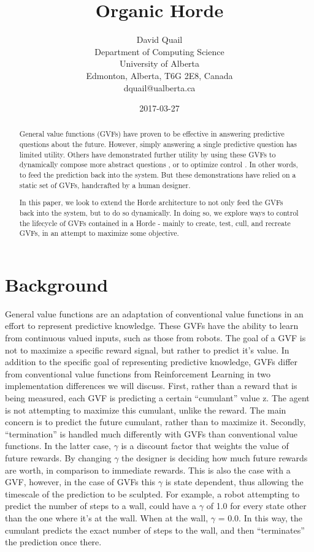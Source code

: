 \documentclass[letterpaper]{article}
\title{Organic Horde}
\date{2017-03-27}
\author{David Quail\\
Department of Computing Science \\ University of Alberta \\
Edmonton, Alberta, T6G 2E8, Canada \\
dquail@ualberta.ca}
\begin{document}
\maketitle
\begin{abstract}
General value functions (GVFs) have proven to be effective in answering predictive questions about the future. However, simply answering a single predictive question has limited utility. Others have demonstrated further utility by using these GVFs to dynamically compose more abstract questions \cite{representingknowledge}, or to optimize control \cite{modayil2014prediction}. In other words, to feed the prediction back into the system. But these demonstrations have relied on a static set of GVFs, handcrafted by a human designer.

In this paper, we look to extend the Horde architecture \cite{sutton2011horde} to not only feed the GVFs back into the system, but to do so dynamically. In doing so, we explore ways to control the lifecycle of GVFs contained in a Horde - mainly to create, test, cull, and recreate GVFs, in an attempt to maximize some objective.
\end{abstract}
    
\section{Background}

General value functions are an adaptation of conventional value functions in an effort to represent predictive knowledge. These GVFs have the ability to learn from continuous valued inputs, such as those from robots. The goal of a GVF is not to maximize a specific reward signal, but rather to predict it's value. In addition to the specific goal of representing predictive knowledge, GVFs differ from conventional value functions from Reinforcement Learning in two implementation differences we will discuss.
First, rather than a reward that is being measured, each GVF is predicting a certain ``cumulant'' value z. The agent is not attempting to maximize this cumulant, unlike the reward. The main concern is to predict the future cumulant, rather than to maximize it. Secondly, ``termination'' is handled much differently with GVFs than conventional value functions. In the latter case, $\gamma$ is a discount factor that weights the value of future rewards. By changing $\gamma$ the designer is deciding how much future rewards are worth, in comparison to immediate rewards. This is also the case with a GVF, however, in the case of GVFs this $\gamma$ is state dependent, thus allowing the timescale of the prediction to be sculpted. For example, a robot attempting to predict the number of steps to a wall, could have a $\gamma$ of 1.0 for every state other than the one where it's at the wall. When at the wall, $\gamma$ = 0.0. In this way, the cumulant predicts the exact number of steps to the wall, and then ``terminates'' the prediction once there.
\end{document}
